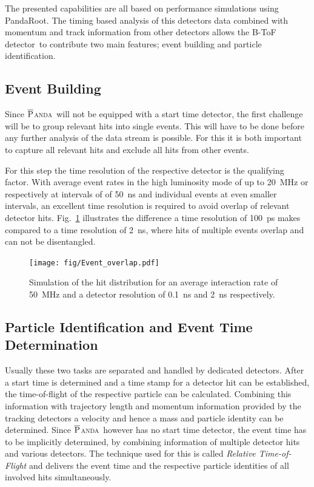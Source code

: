\documentclass[12pt,a4paper,oneside]{article}
\newcommand{\fig}{Fig.}
\newcommand{\panda}{\textsc{$\overline{\textsc{P}}$anda}}
\newcommand{\btofD}{B-ToF detector}
\begin{document}
The presented capabilities are all based on performance simulations using PandaRoot. The timing based analysis of this detectors data combined with momentum and track information from other detectors allows the \btofD\ to contribute two main features; event building and particle identification.

\subsection{Event Building}

Since \panda\ will not be equipped with a start time detector, the first challenge will be to group relevant hits into single events. This will have to be done before any further analysis of the data stream is possible. For this it is both important to capture all relevant hits and exclude all hits from other events.

For this step the time resolution of the respective detector is the qualifying factor. With average event rates in the high luminosity mode of up to \SI{20}{MHz} or respectively at intervals of of \SI{50}{ns} and individual events at even smaller intervals, an excellent time resolution is required to avoid overlap of relevant detector hits. \fig~\ref{fig:Event_overlap} illustrates the difference a time resolution of \SI{100}{ps} makes compared to a time resolution of \SI{2}{ns}, where hits of multiple events overlap and can not be disentangled.

\begin{figure}
	\centering
	\texttt{[image: fig/Event\_overlap.pdf]}
	\caption{Simulation of the hit distribution for an average interaction rate of \SI{50}{MHz} and a detector resolution of \SI{0.1}{ns} and \SI{2}{ns} respectively.}
	\label{fig:Event_overlap}
\end{figure}


\subsection{Particle Identification and Event Time Determination}

Usually these two tasks are separated and handled by dedicated detectors.
After a start time is determined and a time stamp for a detector hit can be established, the time-of-flight of the respective particle can be calculated.
Combining this information with trajectory length and momentum information provided by the tracking detectors a velocity and hence a mass and particle identity can be determined.
Since \panda\ however has no start time detector, the event time has to be implicitly determined, by combining information of multiple detector hits and various detectors.
The technique used for this is called \emph{Relative Time-of-Flight} and delivers the event time and the respective particle identities of all involved hits simultaneously.
\end{document}
